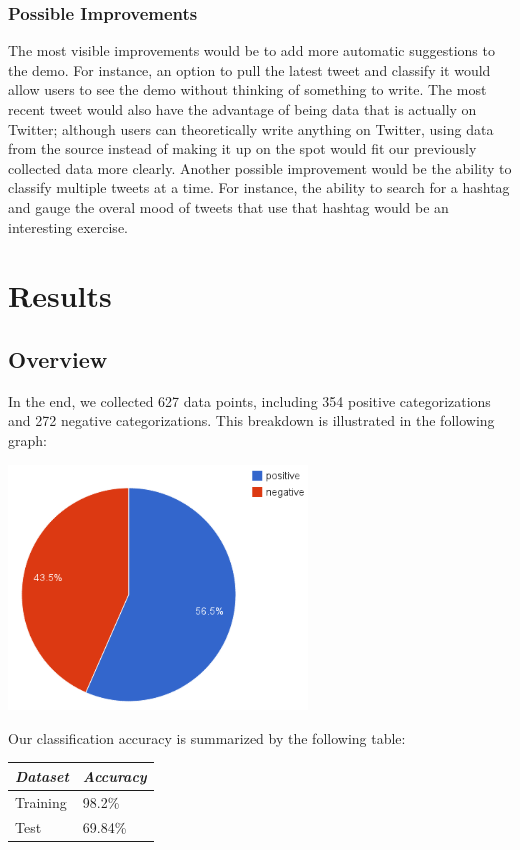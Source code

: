 \documentclass[12pt,a4paper]{article}
\begin{document}
\subsubsection{Possible Improvements}
The most visible improvements would be to add more automatic suggestions to the demo. For instance, an option to pull the latest tweet and classify it would allow users to see the demo without thinking of something to write. The most recent tweet would also have the advantage of being data that is actually on Twitter; although users can theoretically write anything on Twitter, using data from the source instead of making it up on the spot would fit our previously collected data more clearly. Another possible improvement would be the ability to classify multiple tweets at a time. For instance, the ability to search for a hashtag and gauge the overal mood of tweets that use that hashtag would be an interesting exercise.

\section { Results }

\subsection{Overview}

In the end, we collected 627 data points, including 354 positive categorizations and 272 negative categorizations. This breakdown is illustrated in the following graph:

\begin{center}
\includegraphics[width=300px]{figs/pos_neg_breakdown.png}
\end{center}

Our classification accuracy is summarized by the following table:

\begin{tabular}{|l|l|}
\hline
\emph{Dataset} & \emph{Accuracy} \\ \hline
Training & 98.2\% \\ \hline
Test & 69.84\% \\ \hline
\end{tabular}
\end{document}
